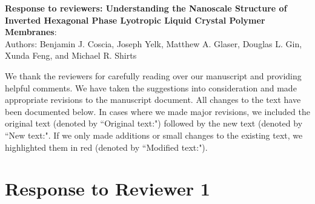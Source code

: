 \documentclass{article}
\begin{document}
\begin{center}
\textbf{Response to reviewers: Understanding the Nanoscale Structure of Inverted Hexagonal Phase Lyotropic Liquid Crystal Polymer Membranes}: \\
Authors: Benjamin J. Coscia, Joseph Yelk, Matthew A. Glaser, Douglas L. Gin, Xunda Feng, and Michael R. Shirts
\end{center}

We thank the reviewers for carefully reading over our manuscript and providing
helpful comments. We have taken the suggestions into consideration and made
appropriate revisions to the manuscript document. All changes to the text have
been documented below. In cases where we made major revisions, we included the
original text (denoted by ``Original text:") followed by the new text (denoted by
``New text:". If we only made additions or small changes to the existing text, 
we highlighted them in red (denoted by ``Modified text:").

\section{Response to Reviewer 1}
\end{document}
